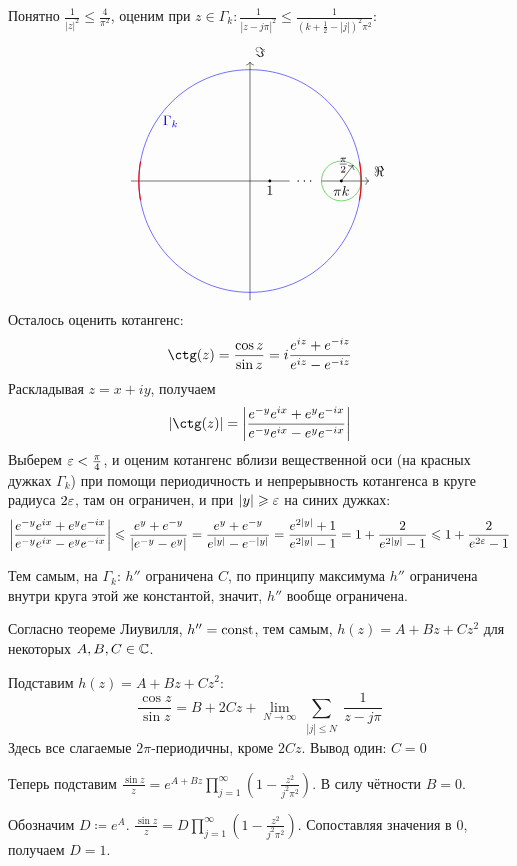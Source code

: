 \documentclass[a4paper]{report}
\begin{document}
{{{            Понятно $\frac{1}{|z|^2} \le \frac{4}{\pi^2}$, оценим при $z \in \Gamma_k: \frac{1}{|z - j\pi|^2} \le \frac{1}{\left(k + \frac{1}{2} - |j|\right)^2\pi^2}$:
            \[\begin{tikzpicture}
                  \draw[] (-3, 0) -- (1, 0);
                  \draw[->] (1.8, 0) -- (3, 0) node[above right] {$\Re$};
                  \draw[->] (0, -3) -- (0, 3) node[above right] {$\Im$};
                  \fill (0.5, 0) circle (1pt) node[below] {$1$};
                  \node at (1.4, 0) {$\dots$};
                  \fill (2.3, 0) circle (1pt) node[below] {$\pi k$};
                  \draw[blue] (0, 0) circle (2.8);
                  \draw[darkgreen] (2.3, 0) circle (0.5);
                  \draw[->] (2.3, 0) -- (2.6, 0.4) node[left] {$\frac{\pi}{2}$};
                  \node[blue] at (-2.5 * 0.8, 2.5 * 0.6) {$\Gamma_k$};
                  \draw[red,thick,smooth,domain=-10:10] plot ({2.8*cos(\x)}, {2.8 * sin(\x)});
                  \draw[red,thick,smooth,domain=170:190] plot ({2.8*cos(\x)}, {2.8 * sin(\x)});
            \end{tikzpicture}\]
            Осталось оценить котангенс:
            \[\ctg(z) = \frac{\cos z}{\sin z} = i \frac{e^{iz} + e^{-iz}}{e^{iz} - e^{-iz}}\]
        Раскладывая $z = x + iy$, получаем
            \[|\ctg(z)| = \abs{\frac{e^{-y}e^{ix} + e^y e^{-ix}}{e^{-y}e^{ix} - e^y e^{-ix}}}\]
            Выберем $\varepsilon < \frac{\pi}{4}$, и оценим котангенс вблизи вещественной оси (на красных дужках $\Gamma_k$) при помощи периодичность и непрерывность котангенса в круге радиуса $2\varepsilon$, там он ограничен, и при $|y| \geqslant \varepsilon$ на синих дужках:
            \[\left|\frac{e^{-y}e^{ix} + e^y e^{-ix}}{e^{-y}e^{ix} - e^y e^{-ix}}\right| \leqslant \frac{e^y + e^{-y}}{|e^{-y} - e^y|} = \frac{e^y + e^{-y}}{e^{|y|} - e^{-|y|}} = \frac{e^{2|y|} + 1}{e^{2|y|} - 1} = 1 + \frac{2}{e^{2|y|} - 1} \leqslant 1 + \frac{2}{e^{2\varepsilon} - 1}\]
        \item Тем самым, на $\Gamma_k$: $h''$ ограничена $C$, по принципу максимума $h''$ ограничена внутри круга этой же константой, значит, $h''$ вообще ограничена.

            Согласно теореме Лиувилля, $h'' = \operatorname{const}$, тем самым, $h(z) = A + Bz + C z^2$ для некоторых $A,B,C \in \mathbb{C}$.
        \item Подставим $h(z) =  A + Bz + C z^2$:
        \[\frac{\cos z}{\sin z} = B + 2Cz + \lim\limits_{N \to \infty}\sum\limits_{\substack{|j| \le N}}\frac{1}{z - j\pi}\]
        Здесь все слагаемые $2\pi$-периодичны, кроме $2 C z$. Вывод один: $C = 0$
        \item Теперь подставим $\frac{\sin z}{z} = e^{A + Bz}\prod\limits_{j = 1}^{\infty}\left(1 - \frac{z^2}{j^2\pi^2}\right)$.
            В силу чётности $B = 0$.
        \item   Обозначим $D \coloneqq e^A$. $\frac{\sin z}{z} = D\prod\limits_{j = 1}^{\infty}\left(1 - \frac{z^2}{j^2\pi^2}\right)$.
        Сопоставляя значения в $0$, получаем $D = 1$.\qedhere
        }
    }
    }
\end{document}
